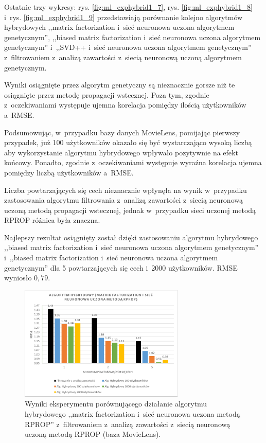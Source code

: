 \documentclass[twoside]{iisthesis}
\begin{document}
		Ostatnie trzy wykresy: rys. \ref{fig:ml_exphybrid1_7}, rys. \ref{fig:ml_exphybrid1_8} i~rys. \ref{fig:ml_exphybrid1_9} przedstawiają porównanie kolejno algorytmów hybrydowych ,,matrix factorization i~sieć neuronowa uczona algorytmem genetycznym'', ,,biased matrix factorization i~sieć neuronowa uczona algorytmem genetycznym'' i~,,SVD++ i~sieć neuronowa uczona algorytmem genetycznym'' z~filtrowaniem z~analizą zawartości z~siecią neuronową uczoną algorytmem genetycznym.
		
		Wyniki osiągnięte przez algorytm genetyczny są nieznacznie gorsze niż te osiągnięte przez metodę propagacji wstecznej. Poza tym, zgodnie z~oczekiwaniami występuje ujemna korelacja pomiędzy ilością użytkowników a~RMSE.
	
		Podsumowując, w~przypadku bazy danych MovieLens, pomijając pierwszy przypadek, już 100 użytkowników okazało się być wystarczająco wysoką liczbą aby wykorzystanie algorytmu hybrydowego wpływało pozytywnie na efekt końcowy. Ponadto, zgodnie z~oczekiwaniami występuje wyraźna korelacja ujemna pomiędzy liczbą użytkowników a~RMSE. 
		
		Liczba powtarzających się cech nieznacznie wpłynęła na wynik w~przypadku zastosowania algorytmu filtrowania z~analizą zawartości z~siecią neuronową uczoną metodą propagacji wstecznej, jednak w~przypadku sieci uczonej metodą RPROP różnica była znaczna. 
		
		Najlepszy rezultat osiągnięty został dzięki zastosowaniu algorytmu hybrydowego ,,biased matrix factorization i~sieć neuronowa uczona algorytmem genetycznym'' i~,,biased matrix factorization i~sieć neuronowa uczona algorytmem genetycznym'' dla 5 powtarzających się cech i~2000 użytkowników. RMSE wyniosło $0,79$.
		
		\begin{figure}
			\centering
			\includegraphics[width=0.7\textwidth]{ml_exphybrid1_4}			
			\caption{Wyniki eksperymentu porównującego działanie algorytmu hybrydowego ,,matrix factorization i~sieć neuronowa uczona metodą RPROP'' z~filtrowaniem z~analizą zawartości z~siecią neuronową uczoną metodą RPROP (baza MovieLens).}
			\label{fig:ml_exphybrid1_4}
		\end{figure}
		
\end{document}
